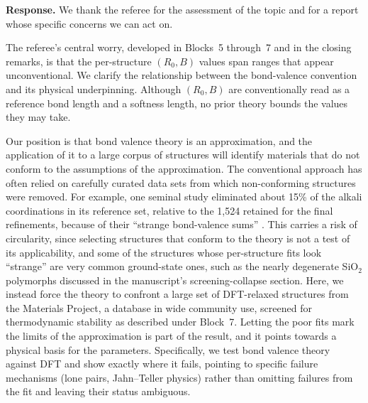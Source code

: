 \documentclass[11pt]{article}
\begin{document}
\textbf{Response.}  We thank the referee for the assessment of the
topic and for a report whose specific concerns we can act on.  

The referee's central worry, developed in Blocks~5 through~7 and in the
closing remarks, is that the per-structure $(R_0,B)$ values span
ranges that appear unconventional.  We clarify the relationship
between the bond-valence convention and its physical underpinning.
Although $(R_0,B)$ are conventionally read as a reference bond length
and a softness length, no prior theory bounds the values they may
take.

Our position is that bond valence theory is an approximation, and the
application of it to a large corpus of structures will identify materials that do 
not conform to the assumptions of the approximation. The conventional approach has 
often relied on carefully curated data sets from which non-conforming structures were removed. 
For example, one seminal study eliminated about 15\% of the alkali coordinations in its
reference set, relative to the 1{,}524 retained for the final refinements,
because of their ``strange bond-valence sums'' \cite{Adams2001}.
This carries a risk of circularity, since selecting structures that
conform to the theory is not a test of its applicability, and some of
the structures whose per-structure fits look ``strange'' are very
common ground-state ones, such as the nearly degenerate SiO$_2$ polymorphs
discussed in the manuscript's screening-collapse section.  Here, we instead
force the theory to confront a large set of DFT-relaxed structures from the
Materials Project, a database in wide community use, screened for
thermodynamic stability as described under Block~7. 
Letting the poor fits mark the limits of the approximation is part
of the result, and it points towards a physical basis for the
parameters.  Specifically, we test bond valence theory against DFT and show exactly where it fails,
pointing to specific failure mechanisms (lone pairs, Jahn--Teller physics) 
rather than omitting failures from the fit and leaving their status ambiguous.
\end{document}
